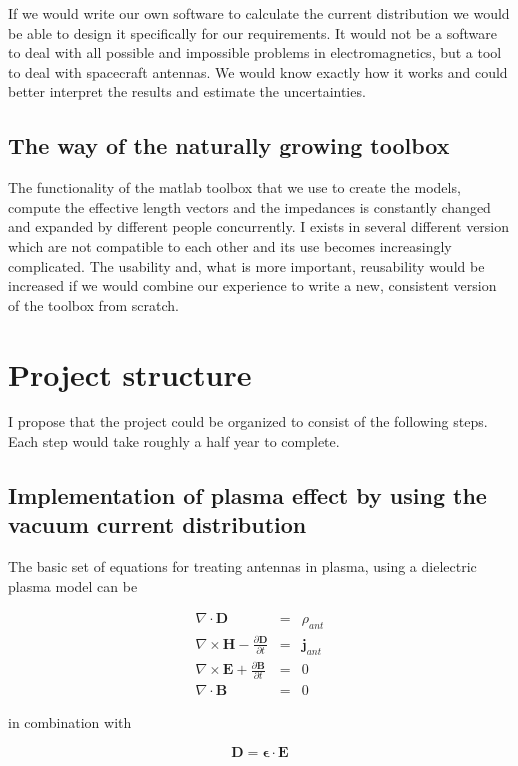 \documentclass[a4paper,10pt]{article}
\begin{document}
If we would write our own software to calculate the current distribution we would be able to design it specifically for our requirements. It would not be a software to deal with all possible and impossible problems in electromagnetics, but a tool to deal with spacecraft antennas. We would know exactly how it works and could better interpret the results and estimate the uncertainties.


\subsection{The way of the naturally growing toolbox}
The functionality of the matlab toolbox that we use to create the models, compute the effective length vectors and the impedances is constantly changed and expanded by different people concurrently. I exists in several different version which are not compatible to each other and its use becomes increasingly complicated. The usability and, what is more important, reusability would be increased if we would combine our experience to write a new, consistent version of the toolbox from scratch.

\section{Project structure}
I propose that the project could be organized to consist of the following steps. Each step would take roughly a half year to complete.

\subsection{Implementation of plasma effect by using the vacuum current distribution}
The basic set of equations for treating antennas in plasma, using a dielectric plasma model can be

\begin{eqnarray}
  \nabla \cdot \mathbf{D} &=& \rho_{ant} \label{max1}\\
\nabla \times \mathbf{H}- \frac{\partial \mathbf{D}}{\partial t}&=& \mathbf{j}_{ant} \\
\nabla \times \mathbf{E} + \frac{\partial \mathbf{B}}{\partial t} &=& 0 \\
\nabla \cdot \mathbf{B} &=& 0\label{max4}
\end{eqnarray}

in combination with

\begin{equation}
    \mathbf{D}=\mathbf{\epsilon} \cdot \mathbf{E}
\end{equation}
\end{document}
